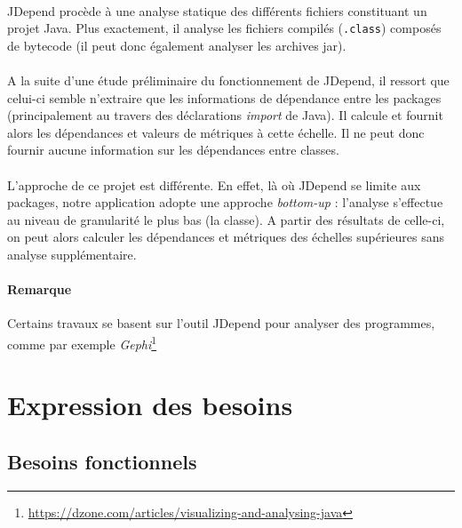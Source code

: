 \documentclass{scrartcl}
\begin{document}
    \paragraph{}JDepend procède à une analyse statique des différents fichiers constituant un projet Java. Plus exactement, il analyse les fichiers compilés (\texttt{.class}) composés de bytecode (il peut donc également analyser les archives jar).
    
    \paragraph{}A la suite d'une étude préliminaire du fonctionnement de JDepend, il ressort que celui-ci semble n'extraire que les informations de dépendance entre les packages (principalement au travers des déclarations \textit{import} de Java). Il calcule et fournit alors les dépendances et valeurs de métriques à cette échelle. Il ne peut donc fournir aucune information sur les dépendances entre classes. 
    
    \paragraph{}L'approche de ce projet est différente. En effet, là où JDepend se limite aux packages, notre application adopte une approche \textit{bottom-up} : l'analyse s'effectue au niveau de granularité le plus bas (la classe). A partir des résultats de celle-ci, on peut alors calculer les dépendances et métriques des échelles supérieures sans analyse supplémentaire.
    
    \paragraph{Remarque}Certains travaux se basent sur l'outil JDepend pour analyser des programmes, comme par exemple \textit{Gephi}\footnote{\url{https://dzone.com/articles/visualizing-and-analysing-java}}







\newpage
\section{Expression des besoins}

\subsection{Besoins fonctionnels}
\end{document}
